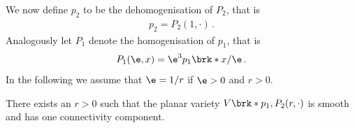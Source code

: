 We now define $p_2$ to be the dehomogenisation of $P_2$, that is
\begin{align*}
  p_2=P_2(1,\cdot)\,.
\end{align*}
Analogously let $P_1$ denote the homogenisation of $p_1$, that is
\begin{align*}
  P_1(\e,x)=\e^3p_1\brk*{x/\e}\,.
\end{align*}
In the following we assume that $\e=1/r$ if $\e>0$ and $r>0$.

%   

\begin{proposition}\label{pr:n3_polynomial_smoothConnected}
  There exists an $r>0$ such that the planar variety $V\brk*{p_1,P_2(r,\cdot)}$ is smooth and
  has one connectivity component.
\end{proposition}
